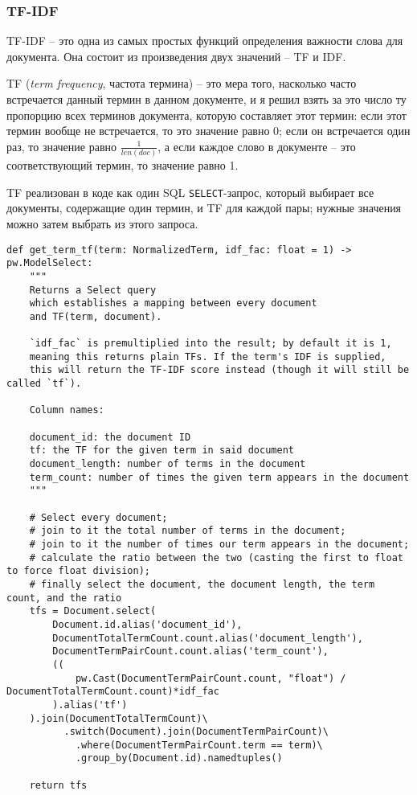 \documentclass[a4page]{article}
\let\Oldsubsubsection\subsubsection
\renewcommand{\subsubsection}{\FloatBarrier\Oldsubsubsection}
\begin{document}
\subsubsection{TF-IDF}

TF-IDF -- это одна из самых простых функций определения важности слова для документа. Она состоит из произведения двух значений -- TF и IDF.

TF (\textit{term frequency}, частота термина) -- это мера того, насколько часто встречается данный термин в данном документе, и я решил взять за это число ту пропорцию всех терминов документа, которую составляет этот термин: если этот термин вообще не встречается, то это значение равно 0; если он встречается один раз, то значение равно $\frac{1}{len(doc)}$, а если каждое слово в документе -- это соответствующий термин, то значение равно 1.

TF реализован в коде как один SQL \texttt{SELECT}-запрос, который выбирает все документы, содержащие один термин, и TF для каждой пары; нужные значения можно затем выбрать из этого запроса.

\begin{verbatim}
def get_term_tf(term: NormalizedTerm, idf_fac: float = 1) -> pw.ModelSelect:
    """
    Returns a Select query
    which establishes a mapping between every document
    and TF(term, document).

    `idf_fac` is premultiplied into the result; by default it is 1,
    meaning this returns plain TFs. If the term's IDF is supplied,
    this will return the TF-IDF score instead (though it will still be called `tf`).

    Column names:

    document_id: the document ID
    tf: the TF for the given term in said document
    document_length: number of terms in the document
    term_count: number of times the given term appears in the document
    """

    # Select every document;
    # join to it the total number of terms in the document;
    # join to it the number of times our term appears in the document;
    # calculate the ratio between the two (casting the first to float to force float division);
    # finally select the document, the document length, the term count, and the ratio
    tfs = Document.select(
        Document.id.alias('document_id'),
        DocumentTotalTermCount.count.alias('document_length'),
        DocumentTermPairCount.count.alias('term_count'),
        ((
            pw.Cast(DocumentTermPairCount.count, "float") / DocumentTotalTermCount.count)*idf_fac
        ).alias('tf')
    ).join(DocumentTotalTermCount)\
          .switch(Document).join(DocumentTermPairCount)\
            .where(DocumentTermPairCount.term == term)\
            .group_by(Document.id).namedtuples()
    
    return tfs
\end{verbatim}
\end{document}
